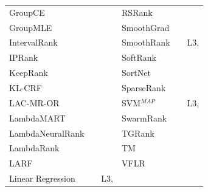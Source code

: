 \documentclass{llncs}
\begin{document}
\begin{table}[!hpt]
{\begin{tabular}{lll|lll}
GroupCE & \cite{Lin2011} & \cite{Lin2011} & RSRank & \cite{Sun2009} & \cite{Lai2013} \\ 
GroupMLE & \cite{Lin2010} & \cite{Lin2011} & SmoothGrad & \cite{Le2007} & \cite{Tan2013} \\ 
IntervalRank & \cite{Moon2010} & \cite{Moon2010,Freno2011} & SmoothRank & \cite{Chapelle2010} & L3, \cite{Chapelle2010} \\
IPRank & \cite{Wang2009b} & \cite{Wang2009b,Torkestani2012} & SoftRank & \cite{Taylor2008,Guiver2008} & \cite{Qin2010b} \\ 
KeepRank & \cite{Chen2009} & \cite{Chen2009} & SortNet & \cite{Rigutini2008} & \cite{Rigutini2008,Freno2011,Papini2012} \\
KL-CRF & \cite{Volkovs2011} & \cite{Volkovs2011} & SparseRank & \cite{Lai2013b} & \cite{Lai2013b} \\ 
LAC-MR-OR & \cite{Veloso2008} & \cite{Veloso2008,Alcantara2010} & SVM$^{MAP}$ & \cite{Yue2007} & L3, \cite{Wang2012,Xu2008,Niu2012} \\ 
LambdaMART & \cite{Burges2010} & \cite{Asadi2013a,Ganjisaffar2011c} &SwarmRank & \cite{Diaz-Aviles2009} & \cite{Sato2013} \\ 
LambdaNeuralRank & \cite{Papini2012} & \cite{Papini2012} & TGRank & \cite{Lai2013} & \cite{Lai2013} \\ 
LambdaRank & \cite{Burges2006} & \cite{Papini2012,Tan2013} & TM & \cite{Zhou2008} & \cite{Zhou2008,Papini2012,Tan2013} \\ 
LARF & \cite{Torkestani2012} & \cite{Torkestani2012} &  VFLR & \cite{Cai2012} & \cite{Cai2012} \\
Linear Regression & \cite{Cossock2006} & L3, \cite{Wang2012,Volkovs2011} & & & \\
\bottomrule
\end{tabular}
}
\end{table}
\vspace{-0.3in}
\end{document}

